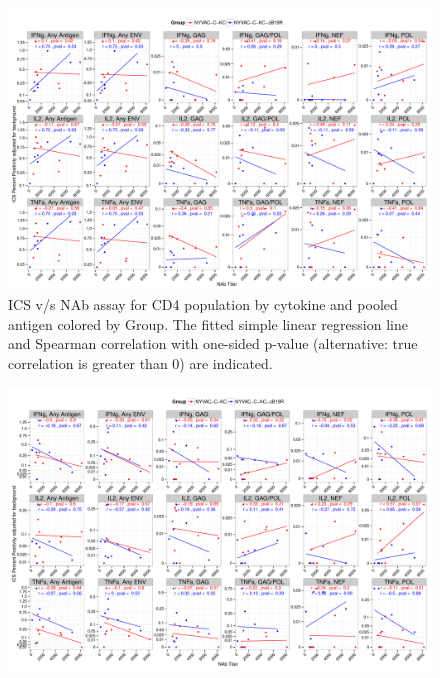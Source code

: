 \documentclass[11pt]{article}\usepackage[]{graphicx}\usepackage[]{color}
\makeatletter
\def\maxwidth{ %
  \ifdim\Gin@nat@width>\linewidth
    \linewidth
  \else
    \Gin@nat@width
  \fi
}
\newenvironment{knitrout}{}{} %
\makeatother
\begin{document}
\begin{landscape}
\begin{figure}[H]
\begin{center}
\begin{knitrout}
\color{fgcolor}
\includegraphics[width=\maxwidth]{figure/corrplot_CD4_NAb_pooledAntigen-1} 

\end{knitrout}
\caption{ICS v/s NAb assay for CD4 population by cytokine and pooled antigen colored by Group. The fitted simple linear regression line and Spearman correlation with one-sided p-value (alternative: true correlation is greater than 0) are indicated.}
\end{center}
\end{figure}



\begin{figure}[H]
\begin{center}
\begin{knitrout}
\color{fgcolor}
\includegraphics[width=\maxwidth]{figure/corrplot_CD8_NAb_pooledAntigen-1} 


\end{knitrout}
\end{center}
\end{figure}
\end{landscape}
\end{document}

